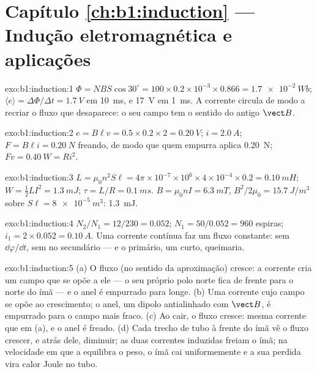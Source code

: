 \section*{Capítulo \ref{ch:b1:induction} --- Indução eletromagnética e aplicações}

\begin{solution}{exo:b1:induction:1}
$\Phi = NBS\cos30^\circ = 100 \times 0.2 \times 10^{-3} \times 0.866 = \qty{1.7e-2}{Wb}$;
$\langle e\rangle = \Delta\Phi/\Delta t = \qty{1.7}{V}$ em \qty{10}{ms}, e \qty{17}{V} em
\qty{1}{ms}. A corrente circula de modo a recriar o fluxo que desaparece: o seu
campo tem o sentido do antigo $\vect B$.
\end{solution}

\begin{solution}{exo:b1:induction:2}
$e = B\ell v = 0.5 \times 0.2 \times 2 = \qty{0.20}{V}$; $i = \qty{2.0}{A}$; $F = B\ell i =
\qty{0.20}{N}$ freando, de modo que quem empurra aplica \qty{0.20}{N}; $Fv = \qty{0.40}{W}
= Ri^2$.
\end{solution}

\begin{solution}{exo:b1:induction:3}
$L = \mu_0n^2S\ell = 4\pi \times 10^{-7} \times 10^6 \times 4 \times 10^{-4} \times 0.2 =
\qty{0.10}{mH}$; $W = \tfrac12LI^2 = \qty{1.3}{mJ}$; $\tau = L/R = \qty{0.1}{ms}$.
$B = \mu_0nI = \qty{6.3}{mT}$, $B^2/2\mu_0 = \qty{15.7}{J/m^3}$ sobre
$S\ell = \qty{8e-5}{m^3}$: \qty{1.3}{mJ}.
\end{solution}

\begin{solution}{exo:b1:induction:4}
$N_2/N_1 = 12/230 = 0.052$; $N_1 = 50/0.052 = 960$ espiras; $i_1 = 2 \times 0.052 =
\qty{0.10}{A}$. Uma corrente contínua faz um fluxo constante: sem $\dd\varphi/\dd t$, sem
 no secundário --- e o primário, um curto, queimaria.
\end{solution}

\begin{solution}{exo:b1:induction:5}
(a) O fluxo (no sentido da aproximação) cresce: a corrente cria um campo
que se opõe a ele --- o seu próprio polo norte fica de frente para o norte do ímã --- e o
anel é empurrado para longe. (b) Uma corrente cujo campo se opõe ao crescimento; o
anel, um dipolo antialinhado com $\vect B$, é empurrado para o campo mais
fraco. (c) Ao cair, o fluxo cresce: mesma corrente que em (a), e o anel é
freado. (d) Cada trecho de tubo à frente do ímã vê o fluxo crescer, e
atrás dele, diminuir; as duas correntes induzidas freiam o ímã; na
velocidade em que a  equilibra o peso, o ímã cai
uniformemente e a sua  perdida vira calor Joule no tubo.
\end{solution}

